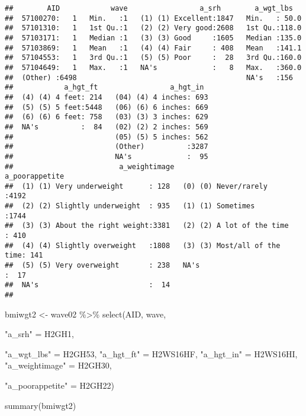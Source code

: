 \documentclass[
]{book}
\newenvironment{Shaded}{\begin{snugshade}}{\end{snugshade}}
\newcommand{\FunctionTok}[1]{\textcolor[rgb]{0.00,0.00,0.00}{#1}}
\newcommand{\NormalTok}[1]{#1}
\newcommand{\OtherTok}[1]{\textcolor[rgb]{0.56,0.35,0.01}{#1}}
\newcommand{\SpecialCharTok}[1]{\textcolor[rgb]{0.00,0.00,0.00}{#1}}
\newcommand{\StringTok}[1]{\textcolor[rgb]{0.31,0.60,0.02}{#1}}
\begin{document}
\begin{verbatim}
##        AID            wave                 a_srh        a_wgt_lbs    
##  57100270:   1   Min.   :1   (1) (1) Excellent:1847   Min.   : 50.0  
##  57101310:   1   1st Qu.:1   (2) (2) Very good:2608   1st Qu.:118.0  
##  57103171:   1   Median :1   (3) (3) Good     :1605   Median :135.0  
##  57103869:   1   Mean   :1   (4) (4) Fair     : 408   Mean   :141.1  
##  57104553:   1   3rd Qu.:1   (5) (5) Poor     :  28   3rd Qu.:160.0  
##  57104649:   1   Max.   :1   NA's             :   8   Max.   :360.0  
##  (Other) :6498                                        NA's   :156    
##            a_hgt_ft                 a_hgt_in   
##  (4) (4) 4 feet: 214   (04) (4) 4 inches: 693  
##  (5) (5) 5 feet:5448   (06) (6) 6 inches: 669  
##  (6) (6) 6 feet: 758   (03) (3) 3 inches: 629  
##  NA's          :  84   (02) (2) 2 inches: 569  
##                        (05) (5) 5 inches: 562  
##                        (Other)          :3287  
##                        NA's             :  95  
##                         a_weightimage                       a_poorappetite
##  (1) (1) Very underweight      : 128   (0) (0) Never/rarely        :4192  
##  (2) (2) Slightly underweight  : 935   (1) (1) Sometimes           :1744  
##  (3) (3) About the right weight:3381   (2) (2) A lot of the time   : 410  
##  (4) (4) Slightly overweight   :1808   (3) (3) Most/all of the time: 141  
##  (5) (5) Very overweight       : 238   NA's                        :  17  
##  NA's                          :  14                                      
## 
\end{verbatim}

\begin{Shaded}
\begin{Highlighting}[]
\NormalTok{bmiwgt2 }\OtherTok{\textless{}{-}}\NormalTok{ wave02 }\SpecialCharTok{\%\textgreater{}\%}
  \FunctionTok{select}\NormalTok{(AID,}
\NormalTok{         wave,}
         
         \StringTok{"a\_srh"} \OtherTok{=}\NormalTok{ H2GH1,}
         
         \StringTok{"a\_wgt\_lbs"} \OtherTok{=}\NormalTok{ H2GH53,}
         \StringTok{"a\_hgt\_ft"} \OtherTok{=}\NormalTok{ H2WS16HF,}
         \StringTok{"a\_hgt\_in"} \OtherTok{=}\NormalTok{ H2WS16HI,}
         \StringTok{"a\_weightimage"} \OtherTok{=}\NormalTok{ H2GH30,}
         
         \StringTok{"a\_poorappetite"} \OtherTok{=}\NormalTok{ H2GH22)}

\FunctionTok{summary}\NormalTok{(bmiwgt2)}
\end{Highlighting}
\end{Shaded}
\end{document}
